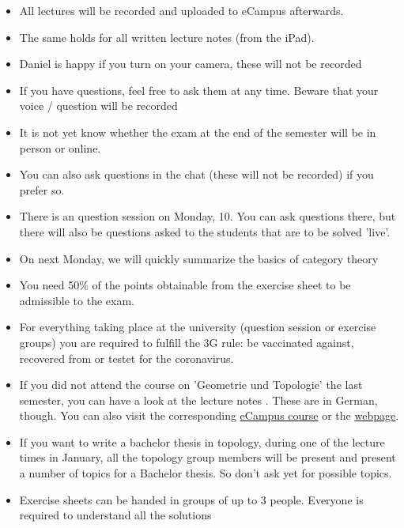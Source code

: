 
\begin{orga}
    \begin{itemize}
    \item All lectures will be recorded and uploaded to eCampus afterwards.
    \item The same holds for all written lecture notes (from the iPad).
    \item Daniel is happy if you turn on your camera, these will not be recorded
    \item If you have questions, feel free to ask them at any time. Beware that your voice / question will be recorded
    \item It is not yet know whether the exam at the end of the semester will be in person or online.
    \item You can also ask questions in the chat (these will not be recorded) if you prefer so.
    \item There is an question session on Monday, 10. You can ask questions there, but there will also be questions asked to the students that are to be solved 'live'.
    \item On next Monday, we will quickly summarize the basics of category theory
    \item You need 50\% of the points obtainable from the exercise sheet to be admissible to the exam.
    \item For everything taking place at the university (question session or exercise groups) you are required to fulfill the 3G rule: be vaccinated against, recovered from or testet for the coronavirus.
    \item If you did not attend the course on 'Geometrie und Topologie' the last semester, you can have a look at the lecture notes \cite{geotopo}. These are in German, though. You can also visit the corresponding \href{https://ecampus.uni-bonn.de/goto_ecampus_crs_2122054.html}{eCampus course} or the \href{http://www.math.uni-bonn.de/people/daniel/2021/geotopo/}{webpage}.
    \item If you want to write a bachelor thesis in topology, during one of the lecture times in January, all the topology group members will be present and present a number of topics for a Bachelor thesis. So don't ask yet for possible topics.
    \item Exercise sheets can be handed in groups of up to 3 people. Everyone is required to understand all the solutions
    \end{itemize}
\end{orga}

